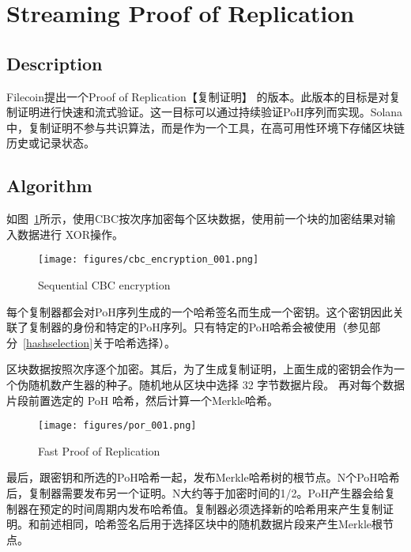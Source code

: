 \documentclass[12pt, uft8]{ctexart}
\begin{document}
\section{Streaming Proof of Replication}\label{porep}
\subsection{Description}
Filecoin提出一个Proof of Replication【复制证明】 \cite{filecoinporep}的版本。此版本的目标是对复制证明进行快速和流式验证。这一目标可以通过持续验证PoH序列而实现。Solana中，复制证明不参与共识算法，而是作为一个工具，在高可用性环境下存储区块链历史或记录状态。

\subsection{Algorithm}
如图~\ref{fig:encrypt}所示，使用CBC按次序加密每个区块数据，使用前一个块的加密结果对输入数据进行 XOR操作。

\begin{figure}[h]
  \begin{center}
    \centering
    \texttt{[image: figures/cbc\_encryption\_001.png]}
    \caption[Fig 7]{Sequential CBC encryption\label{fig:encrypt}}
  \end{center}
  \end{figure}

每个复制器都会对PoH序列生成的一个哈希签名而生成一个密钥。这个密钥因此关联了复制器的身份和特定的PoH序列。只有特定的PoH哈希会被使用（参见部分~\ref{hashselection}关于哈希选择）。

区块数据按照次序逐个加密。其后，为了生成复制证明，上面生成的密钥会作为一个伪随机数产生器的种子。随机地从区块中选择 32 字节数据片段。
再对每个数据片段前置选定的 PoH 哈希，然后计算一个Merkle哈希。

\begin{figure}[h]
  \begin{center}
    \centering
    \texttt{[image: figures/por\_001.png]}
    \caption[Fig 8]{Fast Proof of Replication\label{fig_8}}
  \end{center}
  \end{figure}

最后，跟密钥和所选的PoH哈希一起，发布Merkle哈希树的根节点。N个PoH哈希后，复制器需要发布另一个证明。N大约等于加密时间的1/2。PoH产生器会给复制器在预定的时间周期内发布哈希值。复制器必须选择新的哈希用来产生复制证明。和前述相同，哈希签名后用于选择区块中的随机数据片段来产生Merkle根节点。
\end{document}

